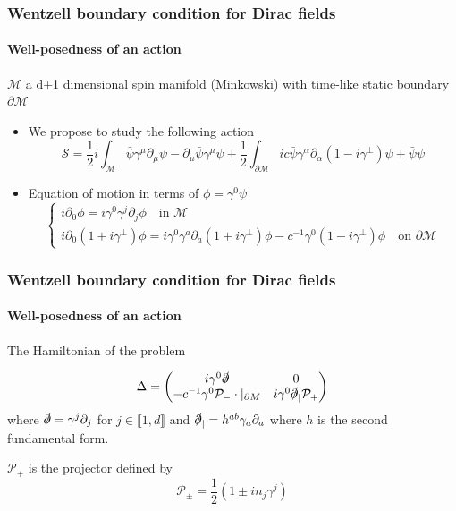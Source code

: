 \documentclass[french]{beamer}
\begin{document}
\begin{frame}[shrink=5]
\frametitle{Wentzell boundary condition for Dirac fields}
\framesubtitle{Well-posedness of an action}

$\mathcal{M}$ a d+1 dimensional spin manifold (Minkowski) with time-like static boundary $\partial\mathcal{M}$
\begin{itemize}
\item We propose to study the following action
\begin{equation*}
\mathcal{S} = \frac{1}{2}i\int_{\mathcal{M}} \bar{\psi} \gamma^\mu \partial_\mu \psi - \partial_\mu \bar{\psi} \gamma^\mu \psi 
+ \frac{1}{2}\int_{\partial \mathcal{M}} ic \bar{\psi} \gamma^\alpha \partial_\alpha (1 - i \gamma^\bot) \psi
+ \bar{\psi} \psi
\end{equation*}

\item Equation of motion in terms of $\phi = \gamma^0 \psi$
\begin{equation*}
\begin{cases}
i \partial_0 \phi = i \gamma^0 \gamma^j \partial_j \phi   \quad \textrm{in $\mathcal{M}$}\\
i \partial_0(1 + i\gamma^\bot) \phi = i\gamma^0 \gamma^a \partial_a (1+ i\gamma^\bot)\phi - c^{-1} \gamma^0(1 - i \gamma^{\bot})\phi \quad \textrm{on $\partial \mathcal{M}$}
\end{cases}
\end{equation*}

\end{itemize}

\end{frame}
\begin{frame}
\frametitle{Wentzell boundary condition for Dirac fields}
\framesubtitle{Well-posedness of an action}
The Hamiltonian of the problem

\begin{equation*}
\Delta = \begin{pmatrix}
i \gamma^0 \slashed{\partial}  & 0 \\
-c^{-1} \gamma^0 \mathcal{P}_- \cdot \vert_{\partial M}&  i\gamma^0 \slashed{\partial}_| \mathcal{P}_+
\end{pmatrix}
\end{equation*}
where $\slashed{\partial} = \gamma^j\partial_j$ for
$j \in \llbracket 1 , d \rrbracket$ and $\slashed{\partial}_| = h^{ab} \gamma_{a} \partial_{a}$ where $h$ is the second fundamental form.

$\mathcal{P}_+$ is the projector defined by
\begin{equation*}
\mathcal{P}_\pm = \frac{1}{2}(1 \pm i n_j\gamma^j) 
\end{equation*}

\end{frame}
\end{document}
